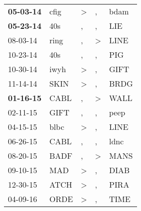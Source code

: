 \begin{supertabular}{p{0.07\textwidth}p{0.06\textwidth}p{0.02\textwidth}p{0.02\textwidth}p{0.06\textwidth}}
 \textbf{05-03-14\textsuperscript{}} &           cfig\textsuperscript{} &     \textgreater &                , &           bdam\textsuperscript{} \\
 \textbf{05-23-14\textsuperscript{}} &            40s\textsuperscript{} &                , &                , &            LIE\textsuperscript{} \\
          08-03-14\textsuperscript{} &           ring\textsuperscript{} &                , &     \textgreater &           LINE\textsuperscript{} \\
          10-23-14\textsuperscript{} &            40s\textsuperscript{} &                , &                , &            PIG\textsuperscript{} \\
          10-30-14\textsuperscript{} &           iwyh\textsuperscript{} &     \textgreater &                , &           GIFT\textsuperscript{} \\
          11-14-14\textsuperscript{} &           SKIN\textsuperscript{} &     \textgreater &                , &           BRDG\textsuperscript{} \\
 \textbf{01-16-15\textsuperscript{}} &           CABL\textsuperscript{} &                , &     \textgreater &           WALL\textsuperscript{} \\
          02-11-15\textsuperscript{} &           GIFT\textsuperscript{} &                , &                , &           peep\textsuperscript{} \\
          04-15-15\textsuperscript{} &           blbc\textsuperscript{} &     \textgreater &                , &           LINE\textsuperscript{} \\
          06-26-15\textsuperscript{} &           CABL\textsuperscript{} &                , &                , &           ldnc\textsuperscript{} \\
          08-20-15\textsuperscript{} &           BADF\textsuperscript{} &                , &     \textgreater &           MANS\textsuperscript{} \\
          09-10-15\textsuperscript{} &            MAD\textsuperscript{} &     \textgreater &                , &           DIAB\textsuperscript{} \\
          12-30-15\textsuperscript{} &           ATCH\textsuperscript{} &     \textgreater &                , &           PIRA\textsuperscript{} \\
          04-09-16\textsuperscript{} &           ORDE\textsuperscript{} &     \textgreater &                , &           TIME\textsuperscript{} \\

\end{supertabular}
